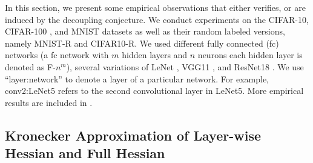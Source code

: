 \label{sec:empirical}
In this section, we present some empirical observations that either verifies, or are induced by the decoupling conjecture.
We conduct experiments on the CIFAR-10, CIFAR-100  \citep{Krizhevsky09learningmultiple}, and MNIST  \citep{lecun1998gradient} datasets as well as their random labeled versions, namely MNIST-R and CIFAR10-R. 
We used different fully connected (fc) networks (a fc network with $m$ hidden layers and $n$ neurons each hidden layer is denoted as F-$n^m$), several variations of LeNet \citep{lecun1998gradient}, VGG11 \citep{simonyan2014very}, and ResNet18 \citep{kaiming2015}.
We use ``layer:network'' to denote a layer of a particular network. For example, conv2:LeNet5 refers to the second convolutional layer in LeNet5.
More empirical results are included in .

\subsection{Kronecker Approximation of Layer-wise Hessian and Full Hessian}\label{subsec:approx}


